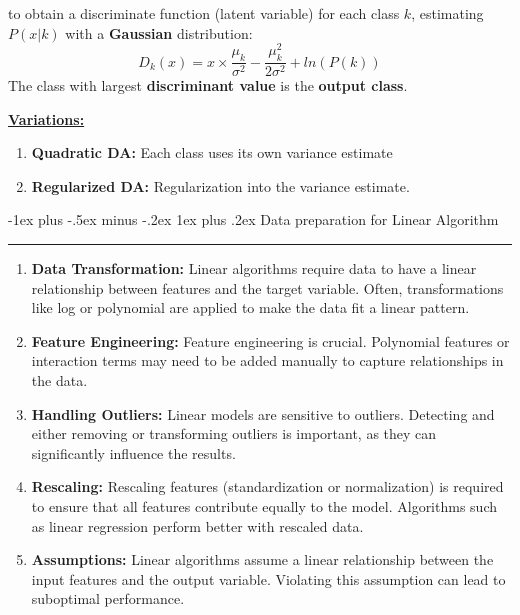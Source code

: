 \documentclass[letterpaper, 10.5pt,landscape]{article}
\makeatletter
\renewcommand{\subsubsection}{\@startsection{subsubsection}{3}{0mm}%
                                {-1ex plus -.5ex minus -.2ex}%
                                {1ex plus .2ex}%
                                {\normalfont\small\bfseries}}
\makeatother
\begin{document}
\begin{multicols*}{3}
to obtain a discriminate function (latent variable) for each class $k$, estimating $P(x|k)$ with a \textbf{Gaussian} distribution:
\vspace{-4pt}
\[\boxed{ D_{k}(x) = x \times \frac{\mu_{k}}{\sigma^{2}} - \frac{\mu_{k}^{2}}{2 \sigma^{2}} + ln(P(k))} \]
The class with largest \textbf{discriminant value} is the \textbf{output class}. 


\vspace{3pt}

\textbf{\underline{Variations:}}
\begin{enumerate}
    \item \textbf{Quadratic DA:} Each class uses its own variance estimate
    \vspace{-2pt}
    \item \textbf{Regularized DA:}  Regularization into the variance estimate.
\end{enumerate}


\subsubsection{Data preparation for Linear Algorithm} {\color{teal}\hrule height 0.5pt} \smallskip

\begin{enumerate}
    \item \textbf{Data Transformation:} 
    Linear algorithms require data to have a linear relationship between features and the target variable. Often, transformations like log or polynomial are applied to make the data fit a linear pattern.
    
    \item \textbf{Feature Engineering:} 
    Feature engineering is crucial. Polynomial features or interaction terms may need to be added manually to capture relationships in the data.

    \item \textbf{Handling Outliers:} 
    Linear models are sensitive to outliers. Detecting and either removing or transforming outliers is important, as they can significantly influence the results.

    \item \textbf{Rescaling:} 
    Rescaling features (standardization or normalization) is required to ensure that all features contribute equally to the model. Algorithms such as linear regression perform better with rescaled data.

    \item \textbf{Assumptions:} 
    Linear algorithms assume a linear relationship between the input features and the output variable. Violating this assumption can lead to suboptimal performance.
\end{enumerate}



\end{multicols*}
\end{document}
